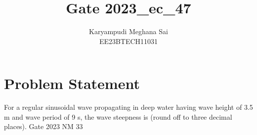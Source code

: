 \documentclass[12pt]{article}
\title{Gate 2023\_ec\_47}
\author{Karyampudi Meghana Sai \\
        EE23BTECH11031}
\begin{document}
\maketitle

\section*{Problem Statement}

For a regular sinusoidal wave propagating in deep water having wave height of 3.5 m and wave period of 9 s, the wave steepness is \underline{\hspace{1cm}} (round off to three decimal places).
\hfill Gate 2023 NM 33
\end{document}
